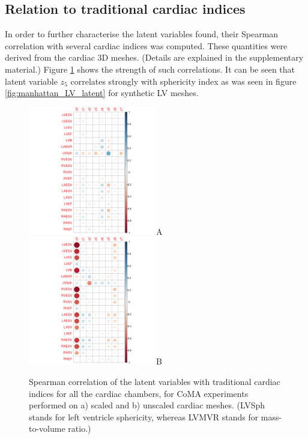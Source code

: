 \subsection*{Relation to traditional cardiac indices}
In order to further characterise the latent variables found, their Spearman correlation with several cardiac indices was computed. These quantities were derived from the cardiac 3D meshes. (Details are explained in the supplementary material.) 
Figure \ref{fig:relation_to_indices} shows the strength of such correlations.
It can be seen that latent variable $z_5$ correlates strongly with sphericity index as was seen in figure \ref{fig:manhattan_LV_latent} for synthetic LV meshes.

\begin{figure}[ht!]
\includegraphics[width=0.5\textwidth]{figs/correlation/experiment_1_vs_cardiac_indices}A
\includegraphics[width=0.5\textwidth]{figs/correlation/experiment_2_vs_cardiac_indices}B
\label{fig:relation_to_indices}
\caption{Spearman correlation of the latent variables with traditional cardiac indices for all the cardiac chambers, for CoMA experiments performed on a) scaled and b) unscaled cardiac meshes. (LVSph stands for left ventricle sphericity, whereas LVMVR stands for mass-to-volume ratio.)}
\end{figure}

